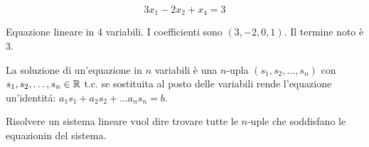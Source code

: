 \[
3x_1 - 2x_2 + x_4 = 3
\]

Equazione lineare in 4 variabili. I coefficienti sono $(3, -2, 0, 1)$. Il termine noto \`e 3.

La soluzione di un'equazione in $n$ variabili \`e una $n$-upla $(s_1, s_2, \dots, s_n)$ con $s_1, s_2, \dots, s_n \in \mathbb{R}$ t.c. se sostituita al posto delle variabili rende l'equazione un'identit\'a: $a_1 s_1 + a_2 s_2 + \dots a_n s_n = b$.

Risolvere un sistema lineare vuol dire trovare tutte le $n$-uple che soddisfano le equazionin del sistema.
















